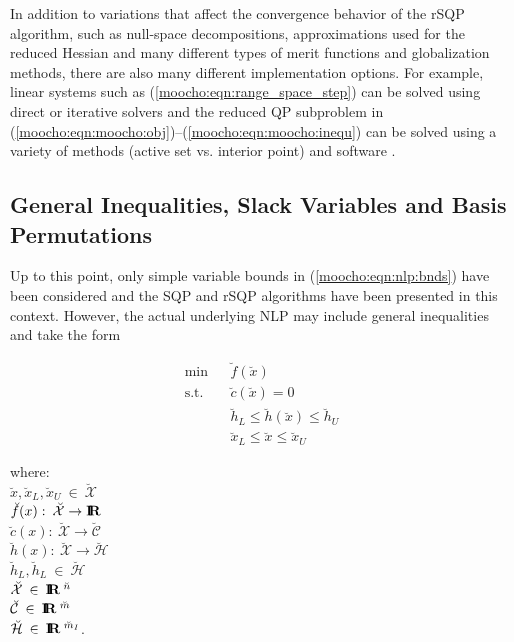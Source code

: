 \documentclass[pdf,ps2pdf,11pt]{SANDreport}
\begin{document}
In addition to variations that affect the convergence behavior of the
rSQP algorithm, such as null-space decompositions, approximations used
for the reduced Hessian and many different types of merit functions
and globalization methods, there are also many different
implementation options.  For example, linear systems such as
(\ref{moocho:eqn:range_space_step}) can be solved using direct or
iterative solvers and the reduced QP subproblem in
(\ref{moocho:eqn:moocho:obj})--(\ref{moocho:eqn:moocho:inequ}) can be
solved using a variety of methods (active set vs. interior point) and
software {}\cite{ref:schmid_qpkwik_1994}.

%
\subsection{General Inequalities, Slack Variables and Basis Permutations}
\label{moocho:sec:nlp_with_slacks}
%

Up to this point, only simple variable bounds in
(\ref{moocho:eqn:nlp:bnds}) have been considered and the SQP and rSQP
algorithms have been presented in this context.  However, the actual
underlying NLP may include general inequalities and take the form
%
{\bsinglespace
\begin{eqnarray}
\mbox{min}  &  & \breve{f}(\breve{x})                                     \label{moocho:eqn:nlporig:obj} \\
\mbox{s.t.} &  & \breve{c}(\breve{x}) = 0                                 \label{moocho:eqn:nlporig:equ} \\
            &  & \breve{h}_L \leq \breve{h}(\breve{x}) \leq \breve{h}_U   \label{moocho:eqn:nlporig:inequ} \\
            &  & \breve{x}_L \leq \breve{x}            \leq \breve{x}_U   \label{moocho:eqn:nlporig:bnds}
\end{eqnarray}
\begin{tabbing}
\hspace{4ex}where:\hspace{5ex}\= \\
\>	$\breve{x}, \breve{x}_L, \breve{x}_U \:\in\:\breve{\mathcal{X}}$ \\
\>	$\breve{f}(x) : \:\breve{\mathcal{X}} \rightarrow \mbox{\textbf{I}}\hspace{-0.6ex}\mbox{\textbf{R}}$ \\
\>	$\breve{c}(x) : \:\breve{\mathcal{X}} \rightarrow \breve{\mathcal{C}}$ \\
\>	$\breve{h}(x) : \:\breve{\mathcal{X}} \rightarrow \breve{\mathcal{H}}$ \\
\>	$\breve{h}_L, \breve{h}_L \:\in\:\breve{\mathcal{H}}$ \\
\>	$\breve{\mathcal{X}} \:\in\:\mbox{\textbf{I}}\hspace{-0.6ex}\mbox{\textbf{R}}\:^{\breve{n}}$ \\
\>	$\breve{\mathcal{C}} \:\in\:\mbox{\textbf{I}}\hspace{-0.6ex}\mbox{\textbf{R}}\:^{\breve{m}}$ \\
\>	$\breve{\mathcal{H}} \:\in\:\mbox{\textbf{I}}\hspace{-0.6ex}\mbox{\textbf{R}}\:^{\breve{m}_I}$.
\end{tabbing}
\esinglespace}
\end{document}
